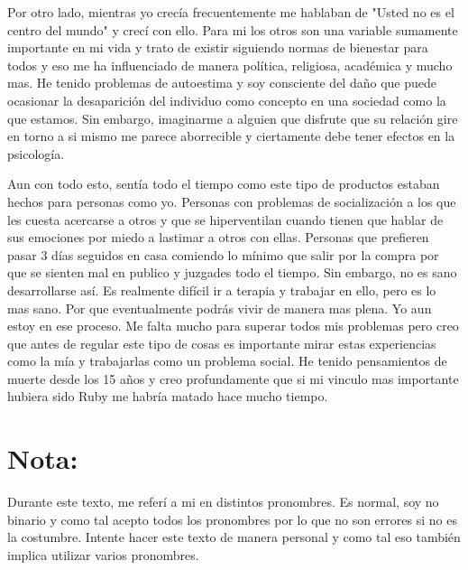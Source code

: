 \documentclass[12pt]{exam}
\begin{document}
Por otro lado, mientras yo crecía frecuentemente me hablaban de "Usted no es el centro del mundo" y crecí con ello. Para mi los otros son una variable sumamente importante en mi vida y trato de existir siguiendo normas de bienestar para todos y eso me ha influenciado de manera política, religiosa, académica y mucho mas. He tenido problemas de autoestima y soy consciente del daño que puede ocasionar la desaparición del individuo como concepto en una sociedad como la que estamos. Sin embargo, imaginarme a alguien que disfrute que su relación gire en torno a si mismo me parece aborrecible y ciertamente debe tener efectos en la psicología.

Aun con todo esto, sentía todo el tiempo como este tipo de productos estaban hechos para personas como yo. Personas con problemas de socialización a los que les cuesta acercarse a otros y que se hiperventilan cuando tienen que hablar de sus emociones por miedo a lastimar a otros con ellas. Personas que prefieren pasar 3 días seguidos en casa comiendo lo mínimo que salir por la compra por que se sienten mal en publico y juzgades todo el tiempo. Sin embargo, no es sano desarrollarse así. Es realmente difícil ir a terapia y trabajar en ello, pero es lo mas sano. Por que eventualmente podrás vivir de manera mas plena. Yo aun estoy en ese proceso. Me falta mucho para superar todos mis problemas pero creo que antes de regular este tipo de cosas es importante mirar estas experiencias como la mía y trabajarlas como un problema social. He tenido pensamientos de muerte desde los 15 años y creo profundamente que si mi vinculo mas importante hubiera sido Ruby me habría matado hace mucho tiempo.

\section*{Nota:}

Durante este texto, me referí a mi en distintos pronombres. Es normal, soy no binario y como tal acepto todos los pronombres por lo que no son errores si no es la costumbre. Intente hacer este texto de manera personal y como tal eso también implica utilizar varios pronombres.
\end{document}
